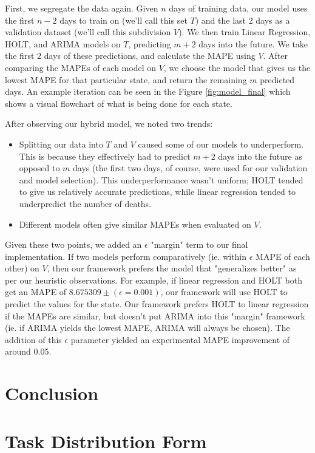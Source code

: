 \documentclass[sigconf,nonacm]{acmart}
\begin{document}
First, we segregate the data again. Given $n$ days of training data, our model
uses the first $n-2$ days to train on (we'll call this set $T$) and the last
$2$ days as a validation dataset (we'll call this subdivision $V$). We then
train Linear Regression, HOLT, and ARIMA models on $T$, predicting $m+2$ days
into the future. We take the first $2$ days of these predictions, and calculate
the MAPE using $V$. After comparing the MAPEs of each model on $V$, we choose
the model that gives us the lowest MAPE for that particular state, and return
the remaining $m$ predicted days. An example iteration can be seen in the 
Figure \ref{fig:model_final} which shows a visual flowchart of what is being done
for each state.

After observing our hybrid model, we noted two trends: 
\begin{itemize}
\item 
Splitting our data into $T$ and $V$ caused some of our models to
underperform. This is because they effectively had to predict $m+2$ days into
the future as opposed to $m$ days (the first two days, of course, were used for
our validation and model selection). This underperformance wasn't uniform;
HOLT tended to give us relatively accurate predictions, while linear regression
tended to underpredict the number of deaths. 
\item
Different models often give similar MAPEs when evaluated on $V$. 
\end{itemize}

Given these two points, we added an $\epsilon$ "margin" term to our final
implementation. If two models perform comparatively (ie. within $\epsilon$ MAPE
of each other) on $V$, then our framework prefers the model that "generalizes
better" as per our heuristic observations. For example, if linear regression
and HOLT both get an MAPE of $8.675309 \pm (\epsilon = 0.001)$, our framework
will use HOLT to predict the values for the state. Our framework prefers HOLT
to linear regression if the MAPEs are similar, but doesn't put ARIMA into this
"margin" framework (ie. if ARIMA yields the lowest MAPE, ARIMA will always be
chosen). The addition of this $\epsilon$ parameter yielded an experimental 
MAPE improvement of around 0.05. 

\section{Conclusion}

\section{Task Distribution Form}
\end{document}
